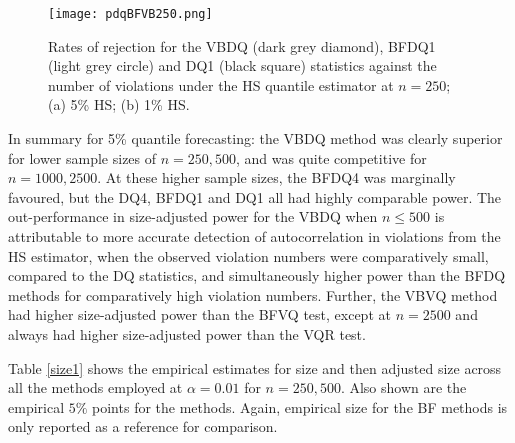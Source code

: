 \documentclass[12pt,epsf]{article}
\begin{document}
\begin{figure}%
     \centering
      \texttt{[image: pdqBFVB250.png]}
\caption{\label{pdqBF250} Rates of rejection for the VBDQ (dark grey diamond), BFDQ1 (light grey circle) and DQ1 (black square) statistics against the
number of violations under the HS quantile estimator at $n=250$; (a) 5\% HS; (b) 1\% HS.}
\end{figure}

In summary for 5\% quantile forecasting: the VBDQ method was clearly superior for lower sample sizes of $n=250, 500$, and was
quite competitive for $n=1000, 2500$. At these higher sample sizes, the BFDQ4 was marginally favoured, but the DQ4, BFDQ1 and DQ1
all had highly comparable power. The out-performance in size-adjusted power for the VBDQ when $n \le 500$ is attributable to more
accurate detection of autocorrelation in violations from the HS estimator, when the observed violation numbers were comparatively small, compared
to the DQ statistics, and simultaneously higher power than the BFDQ methods for comparatively high violation numbers.
Further, the VBVQ method had higher size-adjusted power than the BFVQ test, except at $n=2500$ and always had higher size-adjusted
power than the VQR test.

Table \ref{size1} shows the empirical estimates for size and then adjusted size across all the methods employed at $\alpha=0.01$ for
$n=250, 500$. Also shown are the empirical $5\%$ points for the methods. Again, empirical size for the BF methods is only reported as a
reference for comparison.
\end{document}
